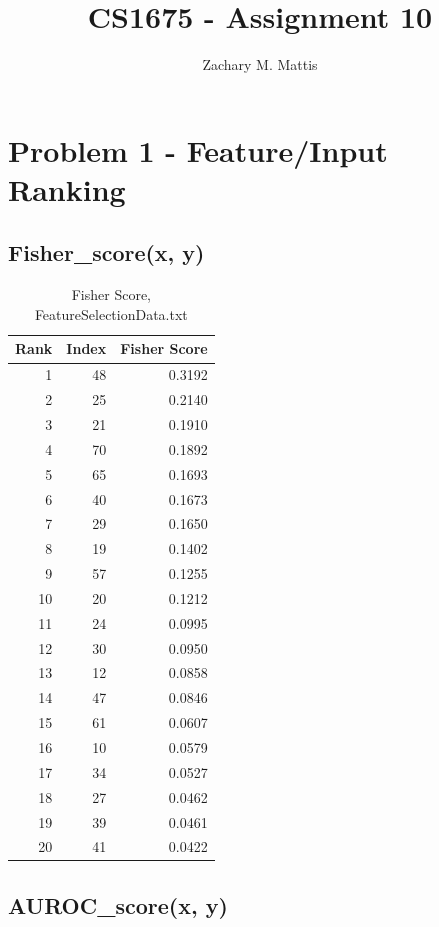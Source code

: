 \documentclass[12pt, letterpaper]{report}
\title{CS1675 - Assignment 10}
\author{Zachary M. Mattis}
\begin{document}
\maketitle

\section{Problem 1 - Feature/Input Ranking}


\subsection{Fisher\_score(x, y)}

\begin{table}[H]
	\centering
	\begin{tabular}{ |r|r|r| }
		\hline
		\textbf{Rank} & \textbf{Index} & \textbf{Fisher Score} \\
		\hline
		1 & 48 & 0.3192 \\
		\hline
		2 & 25 & 0.2140 \\
		\hline
		3 & 21 & 0.1910 \\
		\hline
		4 & 70 & 0.1892 \\
		\hline
		5 & 65 & 0.1693 \\
		\hline		
		6 & 40 & 0.1673 \\
		\hline
		7 & 29 & 0.1650 \\
		\hline
		8 & 19 & 0.1402 \\
		\hline
		9 & 57 & 0.1255 \\
		\hline
		10 & 20 & 0.1212 \\
		\hline
		11 & 24 & 0.0995 \\
		\hline
		12 & 30 & 0.0950 \\
		\hline
		13 & 12 & 0.0858 \\
		\hline
		14 & 47 & 0.0846 \\
		\hline
		15 & 61 & 0.0607 \\
		\hline
		16 & 10 & 0.0579 \\
		\hline
		17 & 34 & 0.0527 \\
		\hline
		18 & 27 & 0.0462 \\
		\hline
		19 & 39 & 0.0461 \\
		\hline
		20 & 41 & 0.0422 \\
		\hline
	\end{tabular}
	\caption{Fisher Score, FeatureSelectionData.txt}
\end{table}


\subsection{AUROC\_score(x, y)}
\end{document}

